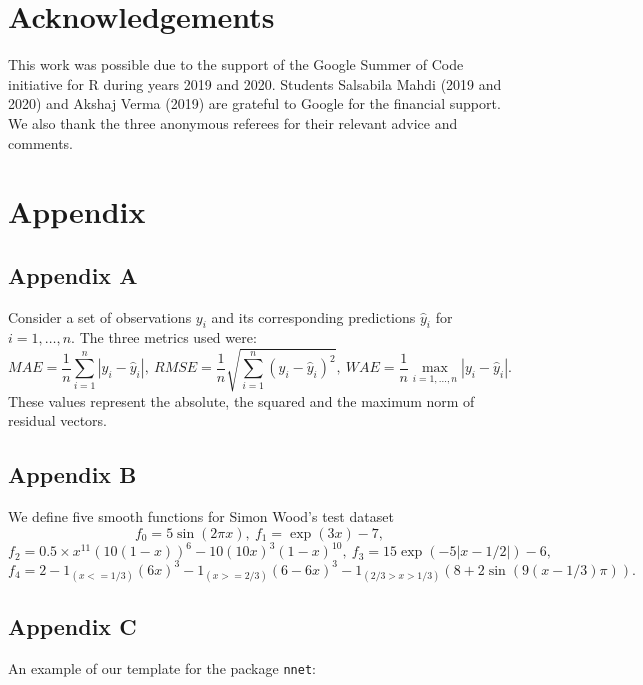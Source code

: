 \hypertarget{acknowledgements}{%
\section{Acknowledgements}\label{acknowledgements}}

This work was possible due to the support of the Google Summer of Code
initiative for R during years 2019 and 2020. Students Salsabila Mahdi
(2019 and 2020) and Akshaj Verma (2019) are grateful to Google for the
financial support. We also thank the three anonymous referees for their
relevant advice and comments.



\hypertarget{appendix}{%
\section{Appendix}\label{appendix}}

\hypertarget{appendix-a}{%
\subsection{Appendix A}\label{appendix-a}}

Consider a set of observations \(y_i\) and its corresponding predictions
\(\hat y_i\) for \(i=1,\dots,n\). The three metrics used were: \[
MAE = \frac1n\sum_{i=1}^n|y_i - \hat y_i|,~
RMSE = \frac1n\sqrt{\sum_{i=1}^n(y_i - \hat y_i)^2},~
WAE = \frac1n\max_{i=1,\dots,n}|y_i - \hat y_i|.
\] These values represent the absolute, the squared and the maximum norm
of residual vectors.

\hypertarget{appendix-b}{%
\subsection{Appendix B}\label{appendix-b}}

We define five smooth functions for Simon Wood's test dataset \[
f_0=5\sin(2\pi x),~
f_1=\exp(3x)-7,
\] \[
f_2=0.5\times x^{11}(10(1 - x))^6 - 10 (10x)^3(1 - x)^{10},~
f_3=15 \exp(-5 |x-1/2|)-6,
\] \[
f_4=2-1_{(x <= 1/3)}(6x)^3 - 1_{(x >= 2/3)} (6-6x)^3 - 
1_{(2/3 > x > 1/3)}(8+2\sin(9(x-1/3)\pi)).
\]

\hypertarget{appendix-c}{%
\subsection{Appendix C}\label{appendix-c}}

An example of our template for the package \texttt{nnet}:

